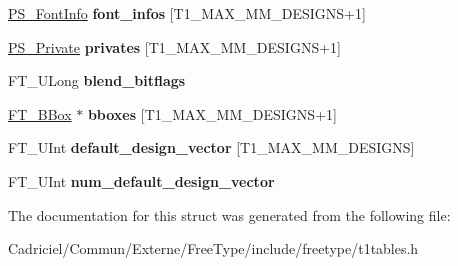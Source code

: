 \begin{DoxyCompactItemize}
\item 
\hyperlink{struct_p_s___font_info_rec__}{P\+S\+\_\+\+Font\+Info} {\bfseries font\+\_\+infos} \mbox{[}T1\+\_\+\+M\+A\+X\+\_\+\+M\+M\+\_\+\+D\+E\+S\+I\+G\+NS+1\mbox{]}\hypertarget{struct_p_s___blend_rec___ac5478cafc838257e693a9604edf1f5e9}{}\label{struct_p_s___blend_rec___ac5478cafc838257e693a9604edf1f5e9}

\item 
\hyperlink{struct_p_s___private_rec__}{P\+S\+\_\+\+Private} {\bfseries privates} \mbox{[}T1\+\_\+\+M\+A\+X\+\_\+\+M\+M\+\_\+\+D\+E\+S\+I\+G\+NS+1\mbox{]}\hypertarget{struct_p_s___blend_rec___a2b6e0c48d7a9c350b09f2943c1779ea4}{}\label{struct_p_s___blend_rec___a2b6e0c48d7a9c350b09f2943c1779ea4}

\item 
F\+T\+\_\+\+U\+Long {\bfseries blend\+\_\+bitflags}\hypertarget{struct_p_s___blend_rec___a86caa5319e208b4a2057db656bad9221}{}\label{struct_p_s___blend_rec___a86caa5319e208b4a2057db656bad9221}

\item 
\hyperlink{struct_f_t___b_box__}{F\+T\+\_\+\+B\+Box} $\ast$ {\bfseries bboxes} \mbox{[}T1\+\_\+\+M\+A\+X\+\_\+\+M\+M\+\_\+\+D\+E\+S\+I\+G\+NS+1\mbox{]}\hypertarget{struct_p_s___blend_rec___a30845d3cbd2e95a5f9cc867c7226af5e}{}\label{struct_p_s___blend_rec___a30845d3cbd2e95a5f9cc867c7226af5e}

\item 
F\+T\+\_\+\+U\+Int {\bfseries default\+\_\+design\+\_\+vector} \mbox{[}T1\+\_\+\+M\+A\+X\+\_\+\+M\+M\+\_\+\+D\+E\+S\+I\+G\+NS\mbox{]}\hypertarget{struct_p_s___blend_rec___a3ddacbda91fe0f9ef934a9e0afa6286f}{}\label{struct_p_s___blend_rec___a3ddacbda91fe0f9ef934a9e0afa6286f}

\item 
F\+T\+\_\+\+U\+Int {\bfseries num\+\_\+default\+\_\+design\+\_\+vector}\hypertarget{struct_p_s___blend_rec___afa5c7dd4206eb8a1d9ef4894abfc9555}{}\label{struct_p_s___blend_rec___afa5c7dd4206eb8a1d9ef4894abfc9555}

\end{DoxyCompactItemize}


The documentation for this struct was generated from the following file\+:\begin{DoxyCompactItemize}
\item 
Cadriciel/\+Commun/\+Externe/\+Free\+Type/include/freetype/t1tables.\+h\end{DoxyCompactItemize}
